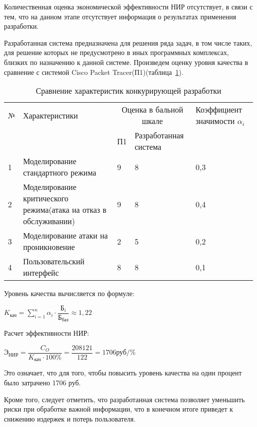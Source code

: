 Количественная оценка экономической эффективности НИР отсутствует, в связи с тем, что на данном этапе отсутствует информация о результатах применения разработки.

Разработанная система предназначена для решения ряда задач, в том числе таких, для решение которых не предусмотрено в иных программных комплексах, близких по назначению к данной системе.  Произведем оценку уровня качества в сравнение с системой Cisco Packet Tracer(П1)(таблица~\ref{table6}).

\begin{table}[h!]
\caption{Сравнение характеристик конкурирующей разработки} \label{table6} 
\begin{tabular}{|p{1em}|p{17em}|p{4em}|p{7em}|p{7em}|}
  \hline
  № & Характеристики & \multicolumn{2}{|c|}{Оценка в бальной шкале} & Коэффициент значимости $\alpha_{i}$ \\
  \ & \ & П1 & Разработанная система & \ \\ \hline
  1 & Моделирование стандартного режима & 9 & 8 & 0,3 \\ \hline
  2 & Моделирование критического режима(атака на отказ в обслуживании) & 9 & 8 & 0,4 \\ \hline
  3 & Моделирование атаки на проникновение & 2 & 5 & 0,2 \\ \hline
  4 & Пользовательский интерфейс & 8 & 8 & 0,1 \\ \hline
\end{tabular}
\end{table}

Уровень качества вычисляется по формуле:

\begin{center}
  $K_{\text{кач}} = \sum_{i=1}^n \alpha_{i} \cdot \dfrac{\text{Б}_{i}}{\text{Б}_{\text{баз}}} \approx 1,22$
\end{center}

Расчет эффективности НИР:

\begin{center}
  $\text{Э}_{\text{НИР}} = \dfrac{C_{O}}{K_{\text{кач}} \cdot 100\%} = \dfrac{208121}{122} = 1706  \text{руб}/\%$
\end{center}

Это означает, что для того, чтобы повысить уровень качества на один процент было затрачено 1706 руб.

Кроме того, следует отметить, что разработанная система позволяет уменьшить риски при обработке важной информации, что в конечном итоге приведет к снижению издержек и потерь пользователя.


